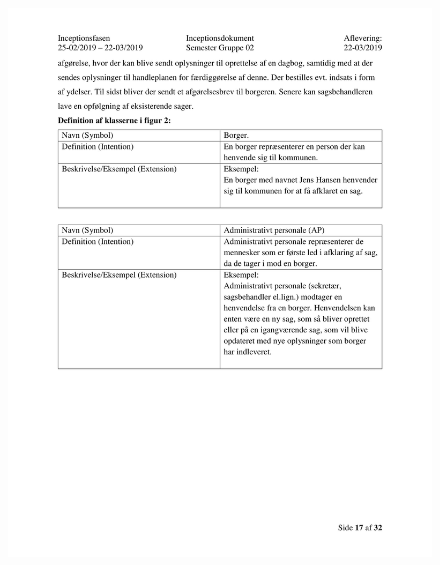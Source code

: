 \begin{figure}[hb]
  \includegraphics[scale = 0.33]{./PNG/Inceptions/Gruppe 02 + InceptionsDokument-18.jpg} 
\end{figure}

